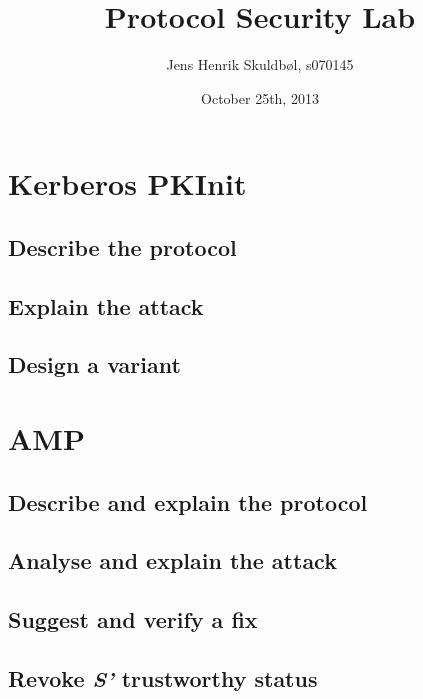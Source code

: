 \documentclass{article}
\title{Protocol Security Lab}
\author{Jens Henrik Skuldbøl, s070145}
\date{October 25th, 2013}
\begin{document}
\maketitle

\section{Kerberos PKInit}

\subsection{Describe the protocol}

\subsection{Explain the attack}

\subsection{Design a variant}

\section{AMP}

\subsection{Describe and explain the protocol}

\subsection{Analyse and explain the attack}

\subsection{Suggest and verify a fix}

\subsection{Revoke \emph{S'} trustworthy status}
\end{document}

